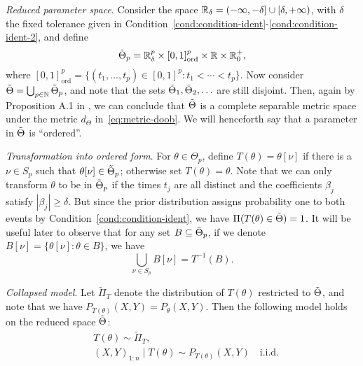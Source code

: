 \textit{Reduced parameter space}. Consider the space \(\mathbb{R}_\delta = (-\infty, -\delta]\cup[\delta, +\infty)\), with \(\delta\) the fixed tolerance given in Condition~\ref{cond:condition-ident}-\ref{cond:condition-ident-2}, and define
\[\tilde{\Theta}_p = \mathbb{R}^p_\delta \times [0,1]^p_{\text{ord}} \times \mathbb{R} \times \mathbb{R}^+_0,
\]
where \(
[0,1]^p_{\text{ord}} =\{(t_1,\dots, t_p) \in [0,1]^p: t_1 < \cdots < t_p\}
\). Now consider \(\tilde{\Theta} = \bigcup_{p\in \mathbb{N}}\tilde{\Theta}_p\), and note that the sets \(\tilde{\Theta}_1,\tilde{\Theta}_2,\ldots\) are still disjoint. Then, again by Proposition A.1 in \citet{miller2023consistency}, we can conclude that \(\tilde{\Theta}\) is a complete separable metric space under the metric \(d_\Theta\) in~\eqref{eq:metric-doob}. We will henceforth say that a parameter in \(\tilde{\Theta}\) is ``ordered''.

\textit{Transformation into ordered form}. For \(\theta\in\Theta_p\), define \(T(\theta)=\theta[\nu]\) if there is a \(\nu\in S_p\) such that \(\theta[\nu]\in \tilde{\Theta}_p\); otherwise set \(T(\theta)=\theta\). Note that we can only transform \(\theta\) to be in \(\tilde{\Theta}_p\) if the times \(t_j\) are all distinct and the coefficients \(\beta_j\) satisfy \(|\beta_j|\geq\delta\). But since the prior distribution assigns probability one to both events by Condition~\ref{cond:condition-ident}, we have \(\Pi(T(\theta)\in\tilde{\Theta})=1\). It will be useful later to observe that for any set \(B\subseteq \tilde{\Theta}_p\), if we denote \(B[\nu] = \{\theta[\nu]: \theta \in B\}\), we have
\begin{equation}\label{eq:inverse-image-T}
  \bigcup_{\nu\in S_p} B[\nu] = T^{-1}(B).
\end{equation}

\textit{Collapsed model}. Let \(\tilde \Pi_T\) denote the distribution of \(T(\theta)\) restricted to \(\tilde{\Theta}\), and note that we have \(P_{T(\theta)}(X,Y)=P_{\theta}(X,Y)\). Then the following model holds on the reduced space \(\tilde{\Theta}\):
\begin{equation}\label{eq:model-linear-collapsed}
  \begin{aligned}
     & T(\theta) \sim \tilde{\Pi}_T,                                         \\
     & (X,Y)_{1:n}\mid T(\theta) \sim P_{T(\theta)}(X,Y) \quad \text{i.i.d.}
  \end{aligned}
\end{equation}


